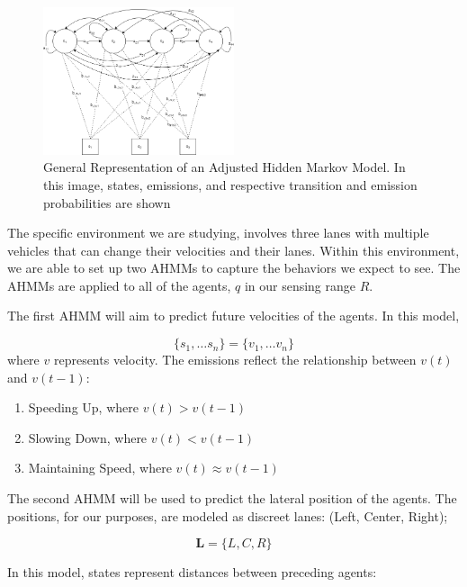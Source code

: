 \documentclass[letterpaper, 10 pt, conference]{ieeeconf}  %
\begin{document}
\begin{figure}[ht]
    \includegraphics[width=0.5\textwidth]{ahmm.png}
    \caption{General Representation of an Adjusted Hidden Markov Model. In this image, states, emissions, and respective transition and emission probabilities are shown}
    \label{fig:hmm}
\end{figure}

The specific environment we are studying, involves three lanes with multiple vehicles that can change their velocities and their lanes. Within this environment, we are able to set up two AHMMs to capture the behaviors we expect to see. The AHMMs are applied to all of the agents, $q$ in our sensing range $R$.

The first AHMM will aim to predict future velocities of the agents. In this model,

\begin{equation}
\{s_1,\ldots s_n\} = \{v_1,\ldots v_n\}
\end{equation}
    where $v$ represents velocity. The emissions reflect the relationship between $v(t)$ and $v(t-1)$:

\begin{enumerate}
    \item Speeding Up, where $v(t) > v(t-1)$
    \item Slowing Down, where $v(t) < v(t-1)$
    \item Maintaining Speed, where $v(t) \approx v(t-1)$
\end{enumerate}

The second AHMM will be used to predict the lateral position of the agents. The positions, for our purposes, are modeled as discreet lanes: (Left, Center, Right);

\begin{equation}
    \mathbf{L} = \{L,C,R\}
\end{equation}

In this model, states represent distances between preceding agents:
\end{document}
